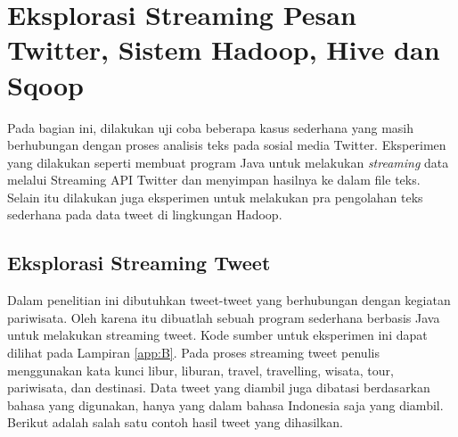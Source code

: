\chapter{Eksplorasi Streaming Pesan Twitter, Sistem Hadoop, Hive dan Sqoop}

Pada bagian ini, dilakukan uji coba beberapa kasus sederhana yang masih berhubungan dengan proses analisis teks pada sosial media Twitter. Eksperimen yang dilakukan seperti membuat program Java untuk melakukan \textit{streaming} data melalui Streaming API Twitter dan menyimpan hasilnya ke dalam file teks. Selain itu dilakukan juga eksperimen untuk melakukan pra pengolahan teks sederhana pada data tweet di lingkungan Hadoop.

\section{Eksplorasi Streaming Tweet}
Dalam penelitian ini dibutuhkan tweet-tweet yang berhubungan dengan kegiatan pariwisata. Oleh karena itu dibuatlah sebuah program sederhana berbasis Java untuk melakukan streaming tweet. Kode sumber untuk eksperimen ini dapat dilihat pada Lampiran \ref{app:B}. Pada proses streaming tweet penulis menggunakan kata kunci libur, liburan, travel, travelling, wisata, tour, pariwisata, dan destinasi. Data tweet yang diambil juga dibatasi berdasarkan bahasa yang digunakan, hanya yang dalam bahasa Indonesia saja yang diambil. Berikut adalah salah satu contoh hasil tweet yang dihasilkan.

